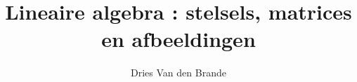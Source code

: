 \usepackage[dutch]{babel}
\usepackage{amsmath}
\usepackage{amssymb}
\newcommand*{\rom}[1]{\expandafter\@slowromancap\romannumeral #1@}
\newcommand{\RNum}[1]{\uppercase\expandafter{\romannumeral #1\relax}}


\title{Lineaire algebra \RNum{1} : stelsels, matrices en afbeeldingen}
\author{Dries Van den Brande}